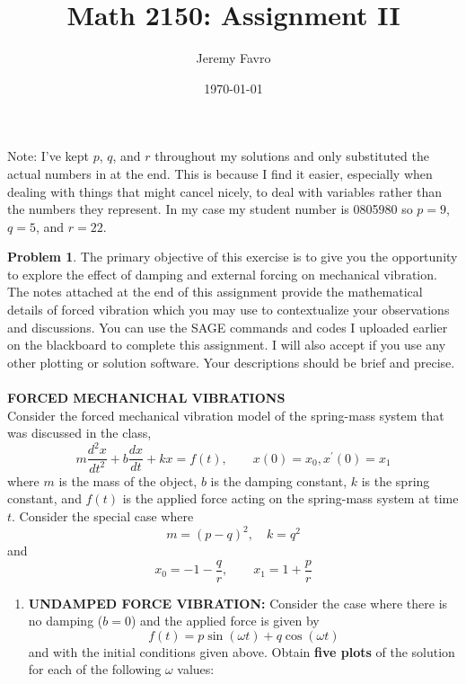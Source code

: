 \documentclass[10pt]{article}
\title{Math 2150: Assignment II}
\author{Jeremy Favro}
\date{\today}
\theoremstyle{definition}
\newtheorem{problem}{Problem}
\begin{document}
\maketitle
\noindent Note: I've kept $p$, $q$, and $r$ throughout my solutions and only substituted the actual numbers in at the end. This is because I find it easier,
especially when dealing with things that might cancel nicely, to deal with variables rather than the numbers they represent. In my case my
student number is 0805980 so $p=9$, $q=5$, and $r=22$.
\\
\begin{problem}
The primary objective of this exercise is to give you the opportunity to explore the effect
of damping and external forcing on mechanical vibration. The notes attached at the end of
this assignment provide the mathematical details of forced vibration which you may use to
contextualize your observations and discussions. You can use the SAGE commands and codes
I uploaded earlier on the blackboard to complete this assignment. I will also accept if you
use any other plotting or solution software. Your descriptions should be brief and precise. \\\\
\textbf{FORCED MECHANICHAL VIBRATIONS}
\\
Consider the forced mechanical vibration model of the spring-mass system that was discussed in the class,
\begin{equation}
  m\frac{d^2x}{dt^2}+b\frac{dx}{dt}+kx=f(t), \qquad x(0)=x_0, x^\prime(0)=x_1
\end{equation}
where $m$ is the mass of the object, $b$ is the damping constant, $k$ is the spring constant, and $f(t)$ is the applied
force acting on the spring-mass system at time $t$. Consider the special case where
\begin{equation}
  m=(p-q)^2,\quad k=q^2
\end{equation}
and
\begin{equation*}
  x_0=-1-\frac{q}{r}, \qquad x_1=1+\frac{p}{r}
\end{equation*}
\begin{enumerate}[label=(\alph*)]
  \item \textbf{UNDAMPED FORCE VIBRATION:} Consider the case where there is no damping ($b = 0$) and the applied force is given by
        \begin{equation}
          f(t)=p\sin\left(\omega t\right)+q\cos\left(\omega t\right)
        \end{equation}
        and with the initial conditions given above. Obtain \textbf{five plots} of the solution for each of the following $\omega$ values:

\end{enumerate}
\end{problem}
\end{document}
